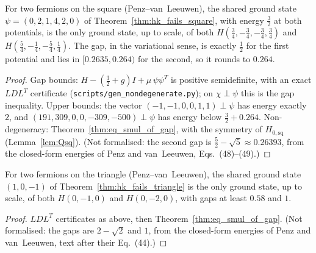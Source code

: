 \begin{theorem}
  \label{thm:square_nondeg}
  \leanok
  For two fermions on the square (Penz--van~Leeuwen), the shared ground state $\psi=(0,2,1,4,2,0)$ of
  Theorem~\ref{thm:hk_fails_square}, with energy $\tfrac32$ at both potentials, is the only ground state, up to
  scale, of both $H(\tfrac34,-\tfrac34,-\tfrac34,\tfrac34)$ and $H(\tfrac54,-\tfrac14,-\tfrac54,\tfrac14)$. The gap,
  in the variational sense, is exactly $\tfrac12$ for the first potential and lies in $[0.2635,0.264)$ for the
  second, so it rounds to $0.264$.
\end{theorem}
\begin{proof}
  \leanok
  Gap bounds: $H-(\tfrac32+g)I+\mu\,\psi\psi^T$ is positive semidefinite, with an exact $LDL^T$ certificate
  (\texttt{scripts/gen\_nondegenerate.py}); on $\chi\perp\psi$ this is the gap inequality. Upper bounds: the
  vector $(-1,-1,0,0,1,1)\perp\psi$ has energy exactly $2$, and $(191,309,0,0,-309,-500)\perp\psi$ has
  energy below $\tfrac32+0.264$. Non-degeneracy: Theorem~\ref{thm:eq_smul_of_gap}, with the symmetry of $H_{0,\mathrm{sq}}$
  (Lemma~\ref{lem:Qsq}). (Not formalised: the second gap
  is $\tfrac52-\sqrt5\approx0.26393$, from the closed-form energies of Penz and van~Leeuwen, Eqs.~(48)--(49).)
\end{proof}

\begin{theorem}
  \label{thm:triangle_nondeg}
  \leanok
  For two fermions on the triangle (Penz--van~Leeuwen), the shared ground state $(1,0,-1)$ of
  Theorem~\ref{thm:hk_fails_triangle} is the only ground state, up to scale, of both $H(0,-1,0)$ and $H(0,-2,0)$,
  with gaps at least $0.58$ and $1$.
\end{theorem}
\begin{proof}
  \leanok
  $LDL^T$ certificates as above, then Theorem~\ref{thm:eq_smul_of_gap}. (Not formalised: the gaps are
  $2-\sqrt2$ and $1$, from the closed-form energies of Penz and van~Leeuwen, text after their Eq.~(44).)
\end{proof}


